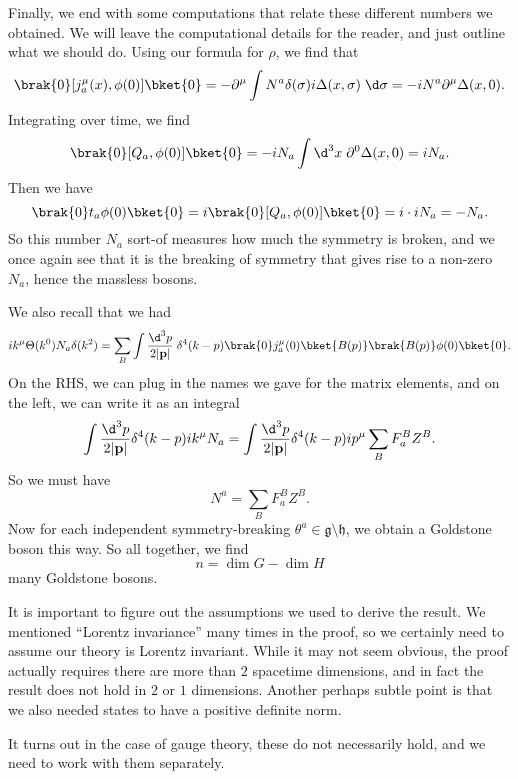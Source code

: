 \documentclass[a4paper]{article}
\begin{document}
Finally, we end with some computations that relate these different numbers we obtained. We will leave the computational details for the reader, and just outline what we should do. Using our formula for $\rho$, we find that
\[
  \brak{0} [j_a^\mu(x), \phi(0)] \bket{0} = - \partial^\mu \int N^a \delta (\sigma) i \Delta(x, \sigma) \;\d \sigma = -iN^a \partial^\mu \Delta(x, 0).
\]
Integrating over time, we find
\[
  \brak{0}[Q_a, \phi(0)]\bket{0} = - iN_a \int \d^3 x\; \partial^0 \Delta(x, 0) = i N_a.
\]
Then we have
\[
  \brak{0} t_a \phi(0)\bket{0} = i \brak{0} [Q_a, \phi(0)]\bket{0} = i  \cdot i N_a = -N_a.
\]
So this number $N_a$ sort-of measures how much the symmetry is broken, and we once again see that it is the breaking of symmetry that gives rise to a non-zero $N_a$, hence the massless bosons.

We also recall that we had
\[
  i k^\mu \Theta(k^0) N_a \delta(k^2) = \sum_B \int \frac{\d^3 p}{2|\mathbf{p}|}\; \delta^4(k - p) \brak{0} j_a^\mu(0) \bket{B(p)} \brak{B(p)} \phi(0) \bket{0}.
\]
On the RHS, we can plug in the names we gave for the matrix elements, and on the left, we can write it as an integral
\[
  \int \frac{\d^3 p}{2|\mathbf{p}|} \delta^4 (k - p) i k^\mu N_a = \int \frac{\d^3 p}{2|\mathbf{p}|} \delta^4(k - p) i p^\mu \sum_B F_a^B Z^B.
\]
So we must have
\[
  N^a = \sum_B F_a^B Z^B.
\]
Now for each independent symmetry-breaking $\theta^a \in \mathfrak{g} \setminus \mathfrak{h}$, we obtain a Goldstone boson this way. So all together, we find
\[
  n = \dim G - \dim H
\]
many Goldstone bosons.

%

It is important to figure out the assumptions we used to derive the result. We mentioned ``Lorentz invariance'' many times in the proof, so we certainly need to assume our theory is Lorentz invariant. While it may not seem obvious, the proof actually requires there are more than $2$ spacetime dimensions, and in fact the result does not hold in $2$ or $1$ dimensions. Another perhaps subtle point is that we also needed states to have a positive definite norm.  %

It turns out in the case of gauge theory, these do not necessarily hold, and we need to work with them separately.

\end{document}
